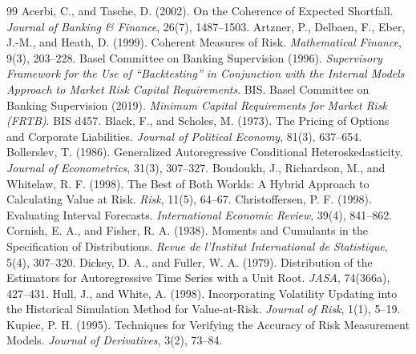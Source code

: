 \documentclass[11pt,a4paper]{article}
\begin{document}
\begingroup
\renewcommand{\section}[2]{}
\small
\begin{thebibliography}{99}
 Acerbi, C., and Tasche, D. (2002). On the Coherence of Expected Shortfall. \textit{Journal of Banking \& Finance}, 26(7), 1487--1503.
 Artzner, P., Delbaen, F., Eber, J.-M., and Heath, D. (1999). Coherent Measures of Risk. \textit{Mathematical Finance}, 9(3), 203--228.
 Basel Committee on Banking Supervision (1996). \textit{Supervisory Framework for the Use of ``Backtesting'' in Conjunction with the Internal Models Approach to Market Risk Capital Requirements}. BIS.
 Basel Committee on Banking Supervision (2019). \textit{Minimum Capital Requirements for Market Risk (FRTB)}. BIS d457.
 Black, F., and Scholes, M. (1973). The Pricing of Options and Corporate Liabilities. \textit{Journal of Political Economy}, 81(3), 637--654.
 Bollerslev, T. (1986). Generalized Autoregressive Conditional Heteroskedasticity. \textit{Journal of Econometrics}, 31(3), 307--327.
 Boudoukh, J., Richardson, M., and Whitelaw, R. F. (1998). The Best of Both Worlds: A Hybrid Approach to Calculating Value at Risk. \textit{Risk}, 11(5), 64--67.
 Christoffersen, P. F. (1998). Evaluating Interval Forecasts. \textit{International Economic Review}, 39(4), 841--862.
 Cornish, E. A., and Fisher, R. A. (1938). Moments and Cumulants in the Specification of Distributions. \textit{Revue de l'Institut International de Statistique}, 5(4), 307--320.
 Dickey, D. A., and Fuller, W. A. (1979). Distribution of the Estimators for Autoregressive Time Series with a Unit Root. \textit{JASA}, 74(366a), 427--431.
 Hull, J., and White, A. (1998). Incorporating Volatility Updating into the Historical Simulation Method for Value-at-Risk. \textit{Journal of Risk}, 1(1), 5--19.
 Kupiec, P. H. (1995). Techniques for Verifying the Accuracy of Risk Measurement Models. \textit{Journal of Derivatives}, 3(2), 73--84.
\end{thebibliography}
\endgroup
\end{document}
